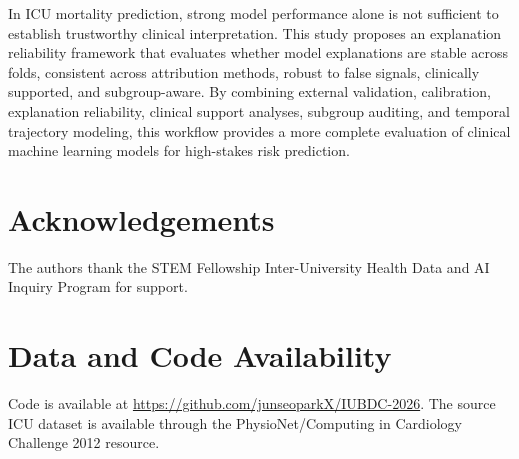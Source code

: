 \documentclass[10pt,twocolumn,letterpaper]{article}
\begin{document}
In ICU mortality prediction, strong model performance alone is not sufficient to establish trustworthy clinical interpretation. This study proposes an explanation reliability framework that evaluates whether model explanations are stable across folds, consistent across attribution methods, robust to false signals, clinically supported, and subgroup-aware. By combining external validation, calibration, explanation reliability, clinical support analyses, subgroup auditing, and temporal trajectory modeling, this workflow provides a more complete evaluation of clinical machine learning models for high-stakes risk prediction.

\section*{Acknowledgements}

The authors thank the STEM Fellowship Inter-University Health Data and AI Inquiry Program for support.

\section*{Data and Code Availability}

\begingroup
\raggedright
Code is available at \href{https://github.com/junseoparkX/IUBDC-2026}{https://github.com/junseoparkX/IUBDC-2026}. The source ICU dataset is available through the PhysioNet/Computing in Cardiology Challenge 2012 resource\cite{silva2012physionet}.
\par
\endgroup
\end{document}
